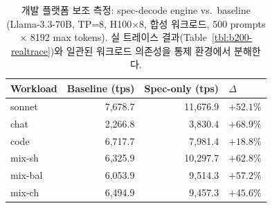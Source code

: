 
\begin{table}[t]
\centering
\caption{개발 플랫폼 보조 측정: spec-decode engine vs.\ baseline
  (Llama-3.3-70B, TP=8, H100$\times$8, 합성 워크로드,
  500 prompts $\times$ 8192 max tokens).
  실 트레이스 결과(Table~\ref{tbl:b200-realtrace})와 일관된 워크로드 의존성을
  통제 환경에서 분해한다.}
\label{tbl:trident-vs-vanilla}
\footnotesize
\begin{tabular}{@{}lrrl@{}}
\toprule
\textbf{Workload} & \textbf{Baseline (tps)} & \textbf{Spec-only (tps)} & \textbf{$\Delta$} \\
\midrule
sonnet  & 7,678.7  & 11,676.9 & $\mathbf{+52.1\%}$ \\
chat    & 2,266.8  & 3,830.4  & $\mathbf{+68.9\%}$ \\
code    & 6,717.7  & 7,981.4  & $\mathbf{+18.8\%}$ \\
mix-sh  & 6,325.9  & 10,297.7 & $+62.8\%$ \\
mix-bal & 6,053.9  & 9,514.3  & $+57.2\%$ \\
mix-ch  & 6,494.9  & 9,457.3  & $+45.6\%$ \\
\bottomrule
\end{tabular}
\end{table}
